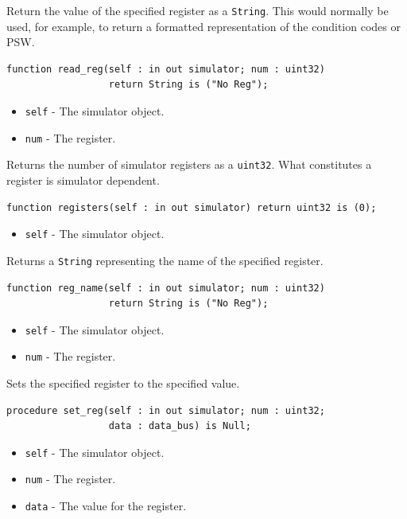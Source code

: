 \documentclass[10pt, openany]{book}
\newcommand{\keyword}[1]{\texttt{#1}}
\newcommand{\datatype}[1]{\texttt{#1}}
\begin{document}
Return the value of the specified register as a \datatype{String}.
This would normally be used, for example, to return a formatted representation of the condition codes or PSW.
\begin{lstlisting}
function read_reg(self : in out simulator; num : uint32)
                  return String is ("No Reg");
\end{lstlisting}
\begin{itemize}
  \item \keyword{self} - The simulator object.
  \item \keyword{num} - The register.
\end{itemize}
Returns the number of simulator registers as a \datatype{uint32}.
What constitutes a register is simulator dependent.
\begin{lstlisting}
function registers(self : in out simulator) return uint32 is (0);
\end{lstlisting}
\begin{itemize}
  \item \keyword{self} - The simulator object.
\end{itemize}

Returns a \datatype{String} representing the name of the specified register.
\begin{lstlisting}
function reg_name(self : in out simulator; num : uint32)
                  return String is ("No Reg");
\end{lstlisting}
\begin{itemize}
  \item \keyword{self} - The simulator object.
  \item \keyword{num} - The register.
\end{itemize}

Sets the specified register to the specified value.
\begin{lstlisting}
procedure set_reg(self : in out simulator; num : uint32;
                  data : data_bus) is Null;
\end{lstlisting}
\begin{itemize}
  \item \keyword{self} - The simulator object.
  \item \keyword{num} - The register.
  \item \keyword{data} - The value for the register.
\end{itemize}

\end{document}
